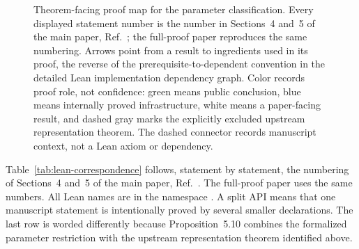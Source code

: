 \documentclass[aps,pra,11pt,onecolumn,nofootinbib,tightenlines]{revtex4-2}
\newcommand{\LeanDecl}[1]{\path{#1}}
\begin{document}
\begin{figure}[htbp]
\caption{Theorem-facing proof map for the parameter classification. Every
displayed statement number is the number in Sections~4 and~5 of the main paper,
Ref.~\cite{rubboli2026complete}; the full-proof paper reproduces the same
numbering. Arrows point from a result to ingredients used in its proof, the
reverse of the prerequisite-to-dependent convention in the detailed Lean
implementation dependency graph. Color
records proof role, not confidence: green means public conclusion, blue means
internally proved infrastructure, white means a paper-facing result, and dashed
gray marks the explicitly excluded upstream representation theorem. The dashed
connector records manuscript context, not a Lean axiom or dependency.}
\label{fig:lean-dependencies}
\end{figure}

Table~\ref{tab:lean-correspondence} follows, statement by statement, the
numbering of Sections~4 and~5 of the main paper,
Ref.~\cite{rubboli2026complete}. The full-proof paper uses the same
numbers. All Lean names are in the namespace \LeanDecl{ConditionalEntropy}. A
split API means that one manuscript statement is intentionally proved by
several smaller declarations. The last row is worded differently because
Proposition~5.10 combines the formalized parameter restriction with the
upstream representation theorem identified above.
\end{document}
